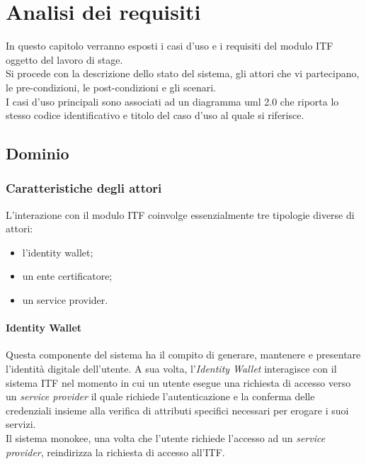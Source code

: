 
\chapter{Analisi dei requisiti}
\label{cap:analisi_dei_requisiti}
In questo capitolo verranno esposti i casi d'uso e i requisiti del modulo \gls{ITF} oggetto del lavoro di stage.\\
Si procede con la descrizione dello stato del sistema, gli attori che vi partecipano, le pre-condizioni, le post-condizioni e gli scenari.\\
I casi d'uso principali sono associati ad un diagramma \gls{uml} 2.0 che riporta lo stesso codice identificativo e titolo del caso d'uso al quale si riferisce.

\section{Dominio}
\subsection{Caratteristiche degli attori}
L'interazione con il modulo \gls{ITF} coinvolge essenzialmente tre tipologie diverse di attori:
\begin{itemize}
	\item l'identity wallet;
	\item un ente certificatore;
	\item un service provider.
\end{itemize}

\subsubsection{Identity Wallet}
Questa componente del sistema ha il compito di generare, mantenere e presentare l'identità digitale dell'utente. A sua volta, l'\textit{Identity Wallet} interagisce con il sistema \gls{ITF} nel momento in cui un utente esegue una richiesta di accesso verso un \textit{service provider} il quale richiede l'autenticazione e la conferma delle credenziali insieme alla verifica di attributi specifici necessari per erogare i suoi servizi.\\
Il sistema \gls{monokee}, una volta che l'utente richiede l'accesso ad un \textit{service provider}, reindirizza la richiesta di accesso all'\gls{ITF}.
